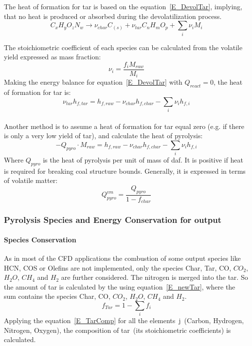 The heat of formation for tar is based on the equation~\ref{E_DevolTar}, implying, that no heat is produced or absorbed during the devolatilization process.
\begin{equation}\label{E_DevolTar}
 C_x H_y O_z N_w \rightarrow \nu_{char}C_{(s)} + \nu_{tar} C_n H_m O_p + \sum_i \nu_i M_i
\end{equation}

The stoichiometric coefficient of each species can be calculated from the volatile yield expressed
as mass fraction:
\begin{equation}\label{E_myTar}
 \nu_i = \frac{f_i M_{raw}}{M_i}
\end{equation}
Making the energy balance for equation~\ref{E_DevolTar} with $Q_{react}=0$, the heat of formation for tar is:
\begin{equation}\label{E_Tar_hf}
 \nu_{tar} h_{f,tar} = h_{f,raw} - \nu_{char} h_{f,char} - \sum_i \nu_i h_{f,i}
\end{equation}\\

Another method is to assume a heat of formation for tar equal zero (e.g. if there is only a very low yield of tar), and calculate the heat of pyrolysis:
\begin{equation}
 - Q_{pyro} \cdot M_{raw} = h_{f,raw} - \nu_{char} h_{f,char} - \sum_i \nu_i h_{f,i}
\end{equation}
Where $Q_{pyro}$ is the heat of pyrolysis per unit of mass of daf. It is positive if heat is
required for breaking coal structure bounds. Generally, it is expressed in terms of volatile matter:
\begin{equation}\label{E_QPyro}
 Q_{pyro}^{vm} = \frac{Q_{pyro}}{1-f_{char}}
\end{equation}

\subsubsection{Pyrolysis Species and Energy Conservation for \FGDVC  output}\label{SSS_ConsEqFGDVC}
\paragraph{Species Conservation}
As in most of the CFD applications the combustion of some \FGDVC output species like HCN, COS or Olefins are not implemented, only the species Char, Tar, CO, $CO_2$, $H_2O$, $CH_4$ and $H_2$ are further considered. The nitrogen is merged into the tar. So the amount of tar is calculated by the using equation~\ref{E_newTar}, where the sum contains the species Char, CO, $CO_2$, $H_2O$, $CH_4$ and $H_2$.
\begin{equation}\label{E_newTar}
 f_{Tar}=1-\sum_i f_i
\end{equation}
Applying the equation~\ref{E_TarComp} for all the elements~j~(Carbon, Hydrogen, Nitrogen, Oxygen), the composition of tar~(its stoichiometric coefficients) is calculated.\\

